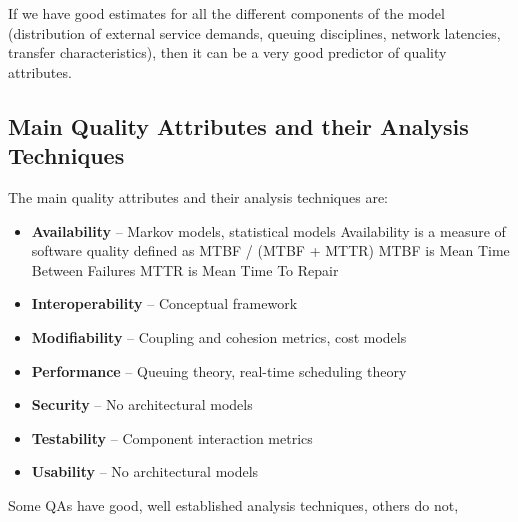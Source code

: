 \documentclass[a4paper]{article}
\begin{document}
If we have good estimates for all the different components of the model (distribution of external service demands, queuing disciplines, network latencies, transfer characteristics), then it can be a very good predictor of quality attributes.

\subsection{Main Quality Attributes and their Analysis Techniques}
The main quality attributes and their analysis techniques are:
\begin{itemize}

\item \textbf{Availability} – Markov models, statistical models \newline
Availability is a measure of software quality defined as MTBF / (MTBF + MTTR)
MTBF is Mean Time Between Failures
MTTR is Mean Time To Repair 

\item \textbf{Interoperability} – Conceptual framework 

\item \textbf{Modifiability} – Coupling and cohesion metrics, cost models

\item \textbf{Performance} – Queuing theory, real-time scheduling theory

\item \textbf{Security} – No architectural models

\item \textbf{Testability} – Component interaction metrics

\item \textbf{Usability} – No architectural models
\end{itemize}

Some QAs have good, well established analysis techniques, others do not,
\end{document}
